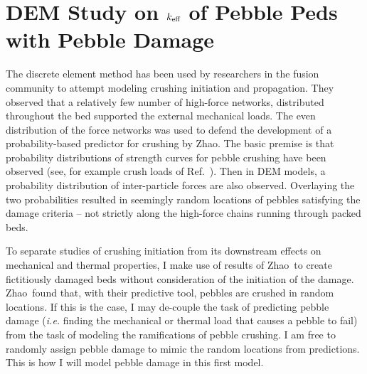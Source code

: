 \section{DEM Study on $k_\text{eff}$ of Pebble Peds with Pebble Damage}\label{sec:dem-studies-effective-conductivity}


The discrete element method has been used by researchers in the fusion community to attempt modeling crushing initiation and propagation\cite{Annabattula2012a, Zhao2012, Zhao2013}. They observed that a relatively few number of high-force networks, distributed throughout the bed supported the external mechanical loads. The even distribution of the force networks was used to defend the development of a probability-based predictor for crushing by Zhao\etal.\cite{Zhao2013} The basic premise is that probability distributions of strength curves for pebble crushing have been observed (see, for example crush loads of Ref.~\cite{Tsuchiya1998}). Then in DEM models, a probability distribution of inter-particle forces are also observed. Overlaying the two probabilities resulted in seemingly random locations of pebbles satisfying the damage criteria -- not strictly along the high-force chains running through packed beds.

To separate studies of crushing initiation from its downstream effects on mechanical and thermal properties, I make use of results of Zhao\etal~to create fictitiously damaged beds without consideration of the initiation of the damage. Zhao\etal~found that, with their predictive tool, pebbles are crushed in random locations. If this is the case, I may de-couple the task of predicting pebble damage (\textit{i.e.} finding the mechanical or thermal load that causes a pebble to fail) from the task of modeling the ramifications of pebble crushing. I am free to randomly assign pebble damage to mimic the random locations from predictions. This is how I will model pebble damage in this first model.

